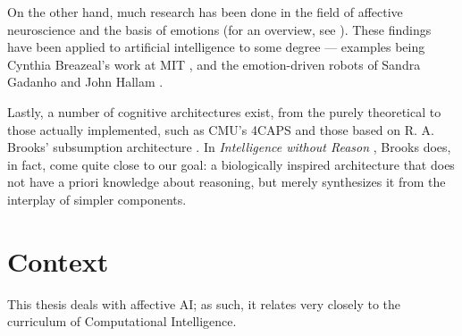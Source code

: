 \documentclass[bibliography=totoc ]{scrartcl}
\begin{document}
On the other hand, much research has been done in the field of affective neuroscience and the basis of emotions (for an overview, see \cite{cambridgeAff}). These findings have been applied to artificial intelligence to some degree --- examples being Cynthia Breazeal's work at MIT \cite{kismet, breazeal2003}, and the emotion-driven robots of Sandra Gadanho and John Hallam \cite{DBLP:journals/adb/GadanhoH01}.

Lastly, a number of cognitive architectures exist, from the purely theoretical \cite{emotionMachine} to those actually implemented, such as CMU's 4CAPS \cite{4caps} and those based on R. A. Brooks' subsumption architecture \cite{brooksSubsumption}. In {\em Intelligence without Reason} \cite{Brooks91intelligencewithout}, Brooks does, in fact, come quite close to our goal: a biologically inspired architecture that does not have a priori knowledge about reasoning, but merely synthesizes it from the interplay of simpler components.

\section{Context}

This thesis deals with affective AI; as such, it relates very closely to the curriculum of Computational Intelligence.

\pagebreak



\end{document}
